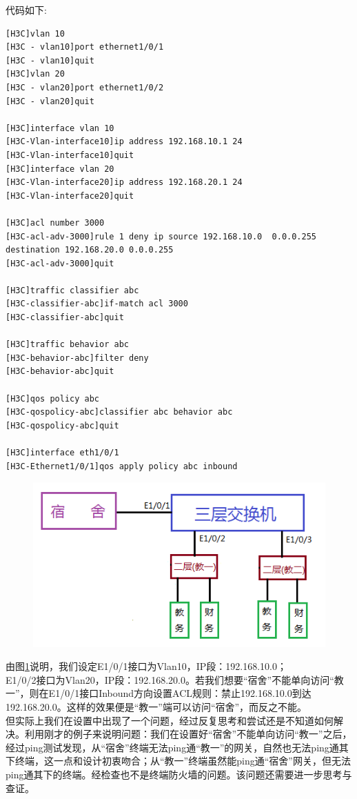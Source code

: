 \indent 代码如下:
\begin{lstlisting}
[H3C]vlan 10
[H3C - vlan10]port ethernet1/0/1
[H3C - vlan10]quit
[H3C]vlan 20
[H3C - vlan20]port ethernet1/0/2
[H3C - vlan20]quit

[H3C]interface vlan 10
[H3C-Vlan-interface10]ip address 192.168.10.1 24
[H3C-Vlan-interface10]quit
[H3C]interface vlan 20
[H3C-Vlan-interface20]ip address 192.168.20.1 24
[H3C-Vlan-interface20]quit

[H3C]acl number 3000
[H3C-acl-adv-3000]rule 1 deny ip source 192.168.10.0  0.0.0.255 destination 192.168.20.0 0.0.0.255
[H3C-acl-adv-3000]quit

[H3C]traffic classifier abc
[H3C-classifier-abc]if-match acl 3000
[H3C-classifier-abc]quit

[H3C]traffic behavior abc
[H3C-behavior-abc]filter deny
[H3C-behavior-abc]quit

[H3C]qos policy abc
[H3C-qospolicy-abc]classifier abc behavior abc
[H3C-qospolicy-abc]quit

[H3C]interface eth1/0/1
[H3C-Ethernet1/0/1]qos apply policy abc inbound
\end{lstlisting}

\begin{figure}[thbp!]
\centering
\includegraphics[width=0.7\linewidth]{figure/safe_4.png}
\caption{}
\label{fig:safe_4}
\end{figure}
\indent 由图\ref{fig:safe_4}说明，我们设定E1/0/1接口为Vlan10，IP段：192.168.10.0；\\
E1/0/2接口为Vlan20，IP段：192.168.20.0。若我们想要“宿舍”不能单向访问“教一”，则在E1/0/1接口Inbound方向设置ACL规则：禁止192.168.10.0到达192.168.20.0。这样的效果便是“教一”端可以访问“宿舍”，而反之不能。\\
\indent 但实际上我们在设置中出现了一个问题，经过反复思考和尝试还是不知道如何解决。利用刚才的例子来说明问题：我们在设置好“宿舍”不能单向访问“教一”之后，经过ping测试发现，从“宿舍”终端无法ping通“教一”的网关，自然也无法ping通其下终端，这一点和设计初衷吻合；从“教一”终端虽然能ping通“宿舍”网关，但无法ping通其下的终端。经检查也不是终端防火­墙的问题。该问题还需要进一步思考与查证。\\
